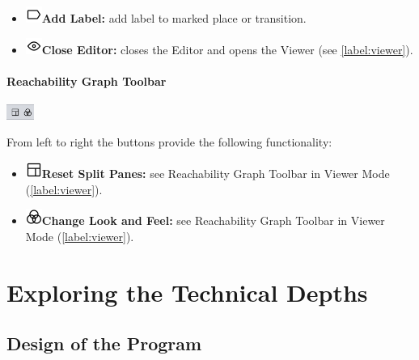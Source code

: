 \documentclass[10pt, a4paper]{article}
\begin{document}
\begin{itemize}
\item\includegraphics[scale=0.4]{../src/resources/images/Toolbar/label.png}\hspace{0.1cm}\textbf{Add Label:} add label to marked place or transition.
\item\includegraphics[scale=0.4]{../src/resources/images/Toolbar/eye.png}\hspace{0.1cm}\textbf{Close Editor:} closes the Editor and opens the Viewer (see \ref{label:viewer}).
\end{itemize}


\paragraph{Reachability Graph Toolbar}

\includegraphics[height=0.5cm]{Editor_Reachability.png}

From left to right the buttons provide the following functionality:
\begin{itemize}
\item\includegraphics[scale=0.4]{../src/resources/images/Toolbar/layout.png}\hspace{0.1cm}\textbf{Reset Split Panes:} see Reachability Graph Toolbar in Viewer Mode (\ref{label:viewer}).
\item\includegraphics[scale=0.4]{../src/resources/images/Toolbar/design.png}\hspace{0.1cm}\textbf{Change Look and Feel:} see Reachability Graph Toolbar in Viewer Mode (\ref{label:viewer}).
\end{itemize}

\section{Exploring the Technical Depths}


\subsection{Design of the Program}
\end{document}
